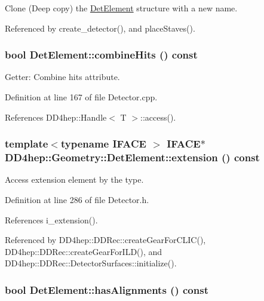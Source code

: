 Clone (Deep copy) the \hyperlink{class_d_d4hep_1_1_geometry_1_1_det_element}{DetElement} structure with a new name. 

Referenced by create\_\-detector(), and placeStaves().\hypertarget{class_d_d4hep_1_1_geometry_1_1_det_element_a64ef93ecc75518cc2d78a6ca0b64d48d}{
\subsubsection[{combineHits}]{\setlength{\rightskip}{0pt plus 5cm}bool DetElement::combineHits () const}}
\label{class_d_d4hep_1_1_geometry_1_1_det_element_a64ef93ecc75518cc2d78a6ca0b64d48d}


Getter: Combine hits attribute. 

Definition at line 167 of file Detector.cpp.

References DD4hep::Handle$<$ T $>$::access().\hypertarget{class_d_d4hep_1_1_geometry_1_1_det_element_a5d801350ab0e5f8918785f3a95e0fb30}{
\subsubsection[{extension}]{\setlength{\rightskip}{0pt plus 5cm}template$<$typename IFACE $>$ IFACE$\ast$ DD4hep::Geometry::DetElement::extension () const}}
\label{class_d_d4hep_1_1_geometry_1_1_det_element_a5d801350ab0e5f8918785f3a95e0fb30}


Access extension element by the type. 

Definition at line 286 of file Detector.h.

References i\_\-extension().

Referenced by DD4hep::DDRec::createGearForCLIC(), DD4hep::DDRec::createGearForILD(), and DD4hep::DDRec::DetectorSurfaces::initialize().\hypertarget{class_d_d4hep_1_1_geometry_1_1_det_element_ab07f17438062035309f2ef52cfe22872}{
\subsubsection[{hasAlignments}]{\setlength{\rightskip}{0pt plus 5cm}bool DetElement::hasAlignments () const}}
\label{class_d_d4hep_1_1_geometry_1_1_det_element_ab07f17438062035309f2ef52cfe22872}



